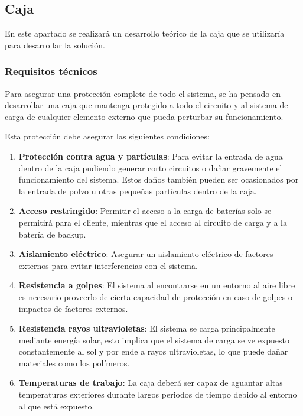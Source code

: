 \documentclass{article}
\begin{document}
\subsection{Caja}

En este apartado se realizará un desarrollo teórico de la caja que se utilizaría para desarrollar la solución.

\subsubsection{Requisitos técnicos}

Para asegurar una protección complete de todo el sistema, se ha pensado en desarrollar una caja que mantenga protegido a todo el circuito y al sistema de carga de cualquier elemento externo que pueda perturbar su funcionamiento.

Esta protección debe asegurar las siguientes condiciones:
\begin{enumerate}
    \item \textbf{Protección contra agua y partículas}: Para evitar la entrada de agua dentro de la caja pudiendo generar corto circuitos o dañar gravemente el funcionamiento del sistema. Estos daños también pueden ser ocasionados por la entrada de polvo u otras pequeñas partículas dentro de la caja. 
    \item \textbf{Acceso restringido}: Permitir el acceso a la carga de baterías solo se permitirá para el cliente, mientras que el acceso al circuito de carga y a la batería de backup. 
    \item \textbf{Aislamiento eléctrico}: Asegurar un aislamiento eléctrico de factores externos para evitar interferencias con el sistema.
    \item \textbf{Resistencia a golpes}: El sistema al encontrarse en un entorno al aire libre es necesario proveerlo de cierta capacidad de protección en caso de golpes o impactos de factores externos.
    \item \textbf{Resistencia rayos ultravioletas}: El sistema se carga principalmente mediante energía solar, esto implica que el sistema de carga se ve expuesto constantemente al sol y por ende a rayos ultravioletas, lo que puede dañar materiales como los polímeros.
    \item \textbf{Temperaturas de trabajo}: La caja deberá ser capaz de aguantar altas temperaturas exteriores durante largos periodos de tiempo debido al entorno al que está expuesto.
\end{enumerate}
\end{document}
